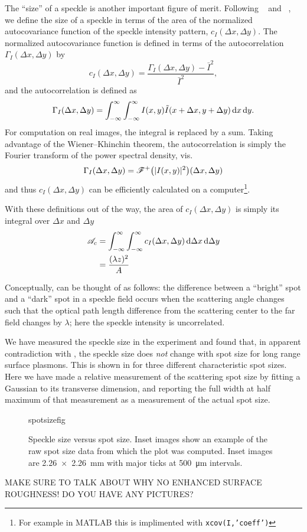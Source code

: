 The ``size'' of a speckle is another important figure of merit.
Following ~\cite{goodman1975statistical} and
~\cite{dainty1975laser}, we define the size of a
speckle in terms of the area of the normalized
autocovariance function of the speckle intensity pattern, $c_I(\Delta x,
\Delta y)$.  The normalized autocovariance function is defined in terms of
the autocorrelation $\Gamma_I(\Delta x, \Delta y)$ by 
\begin{equation}
c_I(\Delta x, \Delta y) = \frac{\Gamma_I(\Delta x, \Delta y) - \bar{I}^2}{\bar{I}^2},
\end{equation}
and the autocorrelation is defined as
\begin{equation}
\Gamma_I(\Delta x, \Delta y) = \int_{-\infty}^{\infty}\int_{-\infty}^{\infty} I(x,y) \tilde{I}(x+\Delta x,y+\Delta y) \,\mathrm{d} x \,\mathrm{d} y.
\end{equation}
For computation on real images, the integral is replaced by a sum.  Taking
advantage of the Wiener–Khinchin theorem, the autocorrelation is simply the
Fourier transform of the power spectral density, vis.
\begin{equation}
\Gamma_I(\Delta x, \Delta y) = {\mathscr{F}^{+}\bigl(|I(x,y)|^2\bigr)}(\Delta x, \Delta y)
\end{equation}
and thus  $c_I(\Delta x, \Delta y)$ can be efficiently calculated on a
computer\footnote{For example in MATLAB this is implimented with
\texttt{xcov(I,'coeff')}}.

With these definitions out of the way, the area of $c_I(\Delta x, \Delta
y)$ is simply its integral over $\Delta x$ and $\Delta y$
\begin{align}
\mathscr{A}_c &= \int_{-\infty}^{\infty}\int_{-\infty}^{\infty} c_I(\Delta x, \Delta y) \,\mathrm{d} \Delta x \,\mathrm{d} \Delta y\\
&=\frac{(\lambda z)^2}{A}
\label{eqn:spotsize}
\end{align}

Conceptually,  can be thought of as follows: the
difference between a ``bright'' spot and a ``dark'' spot in a speckle field
occurs when the scattering angle changes such that the optical path length
difference from the scattering center to the far field changes by
$\lambda$; here the speckle intensity is uncorrelated.

We have measured the speckle size in the experiment and found that, in
apparent contradiction with , the speckle size does
\textit{not} change with spot size for long range surface plasmons.  This
is shown in  for three different characteristic spot
sizes.  Here we have made a relative measurement of the scattering spot
size by fitting a Gaussian to its transverse dimension, and reporting the
full width at half maximum of that measurement as a measurement of the
actual spot size.
\begin{figure}[ht]
 \centering
 {spotsizefig}
 \caption{Speckle size versus spot size.  Inset images show an example of
 the raw spot size data from which the plot was computed.  Inset images are
 \SI{2.26x2.26}{\milli\meter} with major ticks at
 \SI{500}{\micro\meter} intervals.}
\label{fig:spotsize}
\end{figure}

MAKE SURE TO TALK ABOUT WHY NO ENHANCED SURFACE ROUGHNESS!  DO YOU HAVE ANY PICTURES?
